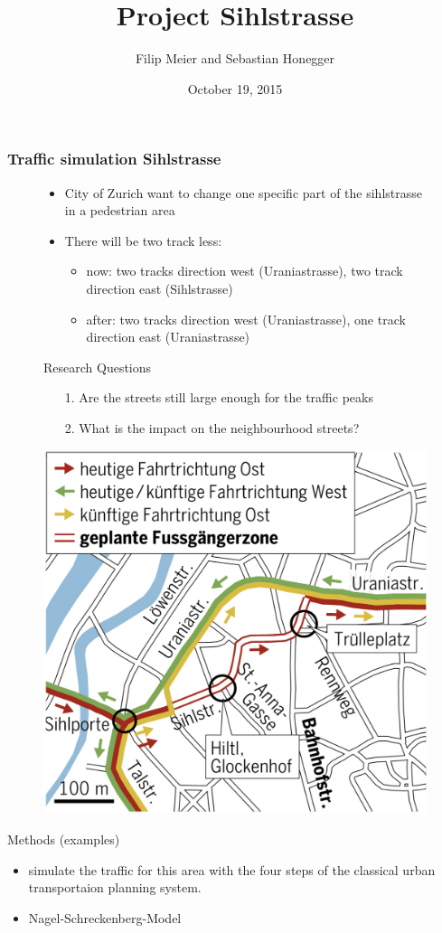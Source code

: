\documentclass[9pt]{beamer}
\title{Project Sihlstrasse}
\institute[ETH Zurich] {Modelling and Simulating Social Systems\\ETH Zurich}
\author[Filip Meier and Sebastian Honegger]{Filip Meier and Sebastian Honegger}
\date{October 19, 2015}
\begin{document}
\begin{frame}
\frametitle{Traffic simulation Sihlstrasse}

\begin{figure}[H]
\begin{minipage}[t]{.5\textwidth}
\begin{itemize}
\item City of Zurich want to change one specific part of the sihlstrasse in a pedestrian area
\item There will be two track less: 
\begin{itemize}
\item now: two tracks direction west (Uraniastrasse), two track direction east (Sihlstrasse)
\item after: two tracks direction west (Uraniastrasse), one track direction east (Uraniastrasse)
\end{itemize}
\end{itemize}
Research Questions
\begin{itemize}
\item[1.] Are the streets  still large enough for the traffic peaks
\item[2.] What is the impact on the neighbourhood streets?
\end{itemize}

\end{minipage}\hfill
\begin{minipage}[t]{.4\textwidth}
	\centering
	\vspace{0pt}
\includegraphics[width=\textwidth]{Plan_Sihlstrasse.png}
\end{minipage}\hfill
\end{figure}
Methods (examples)
\begin{itemize}
\item simulate the traffic for this area with the four steps of the classical urban transportaion planning system.
\item Nagel-Schreckenberg-Model
 
\end{itemize}
\end{frame}
\end{document}
